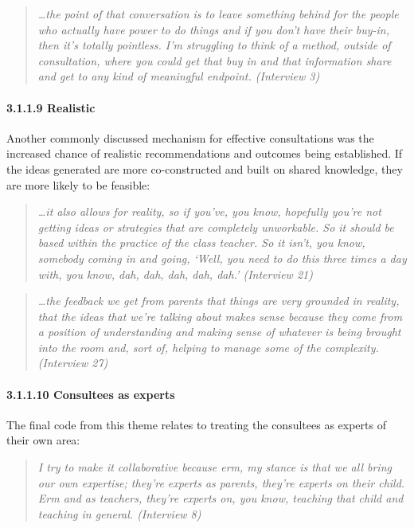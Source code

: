 \documentclass[
  english,
  man]{apa7}
\let\oldparagraph\paragraph
\renewcommand{\paragraph}[1]{\oldparagraph{#1}\mbox{}}
\begin{document}
\begin{quote}
\emph{\ldots the point of that conversation is to leave something behind for the
people who actually have power to do things and if you don't have
their buy-in, then it's totally pointless. I'm struggling to think of
a method, outside of consultation, where you could get that buy in and
that information share and get to any kind of meaningful endpoint.
(Interview 3)}
\end{quote}

\hypertarget{realistic}{%
\paragraph{3.1.1.9 Realistic}\label{realistic}}

Another commonly discussed mechanism for effective consultations was the increased chance of realistic recommendations and outcomes being established. If the ideas generated are more co-constructed and built on shared knowledge, they are more likely to be feasible:

\begin{quote}
\emph{\ldots it also allows for reality, so if you've, you know, hopefully you're
not getting ideas or strategies that are completely unworkable. So it
should be based within the practice of the class teacher. So it isn't,
you know, somebody coming in and going, `Well, you need to do this
three times a day with, you know, dah, dah, dah, dah, dah.' (Interview
21)}
\end{quote}

\begin{quote}
\emph{\ldots the feedback we get from parents that things are very grounded in
reality, that the ideas that we're talking about makes sense because
they come from a position of understanding and making sense of
whatever is being brought into the room and, sort of, helping to
manage some of the complexity. (Interview 27)}
\end{quote}

\hypertarget{consultees-as-experts}{%
\paragraph{3.1.1.10 Consultees as experts}\label{consultees-as-experts}}

The final code from this theme relates to treating the consultees as experts of their own area:

\begin{quote}
\emph{I try to make it collaborative because erm, my stance is that we all
bring our own expertise; they're experts as parents, they're experts
on their child. Erm and as teachers, they're experts on, you know,
teaching that child and teaching in general. (Interview 8)}
\end{quote}
\end{document}
